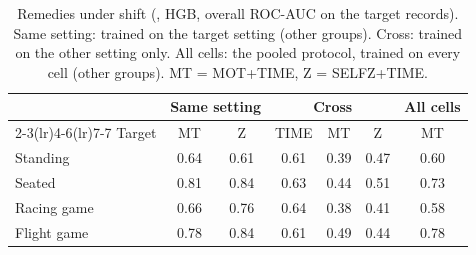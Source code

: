 \begin{table}[t]
\centering
\footnotesize
\caption{Remedies under shift (\sevtwo{}, HGB, overall ROC-AUC on the target records). Same setting: trained on the target setting (other groups). Cross: trained on the other setting only. All cells: the pooled protocol, trained on every cell (other groups). MT = MOT+TIME, Z = SELFZ+TIME.}
\label{tab:mitig}
\setlength{\tabcolsep}{2.4pt}
\begin{tabular}{@{}lcccccc@{}}
\toprule
 & \multicolumn{2}{c}{Same setting} & \multicolumn{3}{c}{Cross} & All cells \\ \cmidrule(lr){2-3}\cmidrule(lr){4-6}\cmidrule(lr){7-7}
Target & MT & Z & TIME & MT & Z & MT \\
\midrule
Standing & 0.64 & 0.61 & 0.61 & 0.39 & 0.47 & 0.60 \\
Seated & 0.81 & 0.84 & 0.63 & 0.44 & 0.51 & 0.73 \\
Racing game & 0.66 & 0.76 & 0.64 & 0.38 & 0.41 & 0.58 \\
Flight game & 0.78 & 0.84 & 0.61 & 0.49 & 0.44 & 0.78 \\
\bottomrule
\end{tabular}
\end{table}